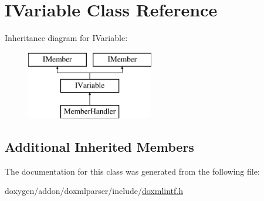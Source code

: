 \hypertarget{class_i_variable}{}\section{I\+Variable Class Reference}
\label{class_i_variable}
Inheritance diagram for I\+Variable\+:\begin{figure}[H]
\begin{center}
\leavevmode
\includegraphics[height=3.000000cm]{class_i_variable}
\end{center}
\end{figure}
\subsection*{Additional Inherited Members}


The documentation for this class was generated from the following file\+:\begin{DoxyCompactItemize}
\item 
doxygen/addon/doxmlparser/include/\mbox{\hyperlink{include_2doxmlintf_8h}{doxmlintf.\+h}}\end{DoxyCompactItemize}

